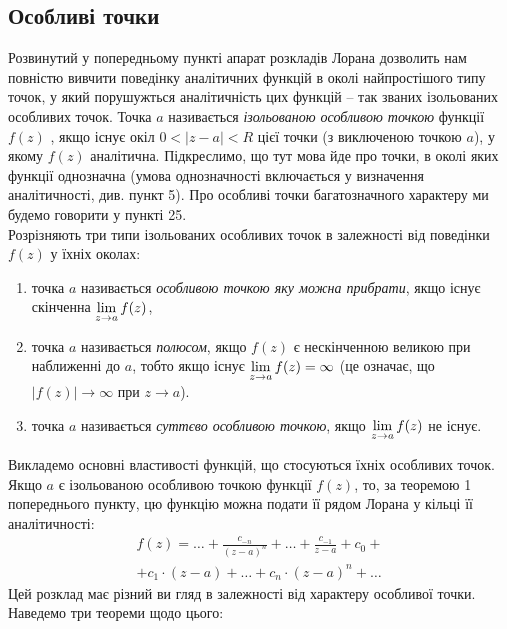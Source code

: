 \subsection{Особливі точки}

Розвинутий у попередньому пункті апарат розкладів Лорана дозволить нам повністю вивчити поведінку аналітичних функцій в околі найпростішого типу точок, у який порушужться аналітичність цих функцій -- так званих ізольованих особливих точок. Точка $a$ називається \textit{ізольованою особливою точкою} функції $f(z)$ , якщо існує окіл $0 < |z - a| < R$ цієї точки (з виключеною точкою $a$), у якому $f(z)$ аналітична. Підкреслимо, що тут мова йде про точки, в околі яких функції однозначна (умова однозначності включається у визначення аналітичності, див. пункт 5). Про особливі точки багатозначного характеру ми будемо говорити у пункті 25. \\

Розрізняють три типи ізольованих особливих точок в залежності від поведінки $f(z)$ у їхніх околах:
\begin{enumerate}
	\item точка $a$ називається \textit{особливою точкою яку можна прибрати}, якщо існує скінченна $\displaystyle\lim\limits_{z \to a} f(z)$,
	\item точка $a$ називається \textit{полюсом}, якщо $f(z)$ є нескінченною великою при наближенні до $a$, тобто якщо існує $\displaystyle\lim\limits_{z \to a} f(z) = \infty$ (це означає, що $|f(z)| \to \infty$ при $z \to a$).
	\item точка $a$ називається \textit{суттєво особливою точкою}, якщо $\displaystyle\lim\limits_{z \to a} f(z)$ не існує.
\end{enumerate}

Викладемо основні властивості функцій, що стосуються їхніх особливих точок. Якщо $a$ є ізольованою особливою точкою функції $f(z)$, то, за теоремою 1 попереднього пункту, цю функцію можна подати її рядом Лорана у кільці її аналітичності:
\begin{multline}
	\label{eq:5.5.1}
	f(z) = \ldots + \frac{c_{-n}}{(z - a)^n} + \ldots + \frac{c_{-1}}{z - a} + c_0 + \\ + c_1 \cdot (z - a) + \ldots + c_n \cdot (z - a)^n + \ldots
\end{multline}
Цей розклад має різний ви гляд в залежності від характеру особливої точки. Наведемо три теореми щодо цього:


